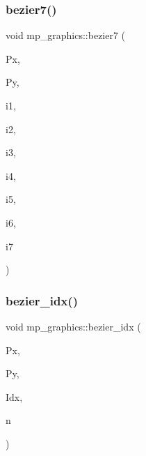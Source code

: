 \mbox{\label{classmp__graphics_ad8ad05acc6d7355cfc86c9c7725434ad}} 
\subsubsection{\texorpdfstring{bezier7()}{bezier7()}}
{\footnotesize\ttfamily void mp\+\_\+graphics\+::bezier7 (\begin{DoxyParamCaption}\item[{\mbox{\hyperlink{galois_8h_a09fddde158a3a20bd2dcadb609de11dc}{I\+NT}} $\ast$}]{Px,  }\item[{\mbox{\hyperlink{galois_8h_a09fddde158a3a20bd2dcadb609de11dc}{I\+NT}} $\ast$}]{Py,  }\item[{\mbox{\hyperlink{galois_8h_a09fddde158a3a20bd2dcadb609de11dc}{I\+NT}}}]{i1,  }\item[{\mbox{\hyperlink{galois_8h_a09fddde158a3a20bd2dcadb609de11dc}{I\+NT}}}]{i2,  }\item[{\mbox{\hyperlink{galois_8h_a09fddde158a3a20bd2dcadb609de11dc}{I\+NT}}}]{i3,  }\item[{\mbox{\hyperlink{galois_8h_a09fddde158a3a20bd2dcadb609de11dc}{I\+NT}}}]{i4,  }\item[{\mbox{\hyperlink{galois_8h_a09fddde158a3a20bd2dcadb609de11dc}{I\+NT}}}]{i5,  }\item[{\mbox{\hyperlink{galois_8h_a09fddde158a3a20bd2dcadb609de11dc}{I\+NT}}}]{i6,  }\item[{\mbox{\hyperlink{galois_8h_a09fddde158a3a20bd2dcadb609de11dc}{I\+NT}}}]{i7 }\end{DoxyParamCaption})}

\mbox{\label{classmp__graphics_afb45b6b5298e90f25523210c68a69184}} 
\subsubsection{\texorpdfstring{bezier\+\_\+idx()}{bezier\_idx()}}
{\footnotesize\ttfamily void mp\+\_\+graphics\+::bezier\+\_\+idx (\begin{DoxyParamCaption}\item[{\mbox{\hyperlink{galois_8h_a09fddde158a3a20bd2dcadb609de11dc}{I\+NT}} $\ast$}]{Px,  }\item[{\mbox{\hyperlink{galois_8h_a09fddde158a3a20bd2dcadb609de11dc}{I\+NT}} $\ast$}]{Py,  }\item[{\mbox{\hyperlink{galois_8h_a09fddde158a3a20bd2dcadb609de11dc}{I\+NT}} $\ast$}]{Idx,  }\item[{\mbox{\hyperlink{galois_8h_a09fddde158a3a20bd2dcadb609de11dc}{I\+NT}}}]{n }\end{DoxyParamCaption})}

